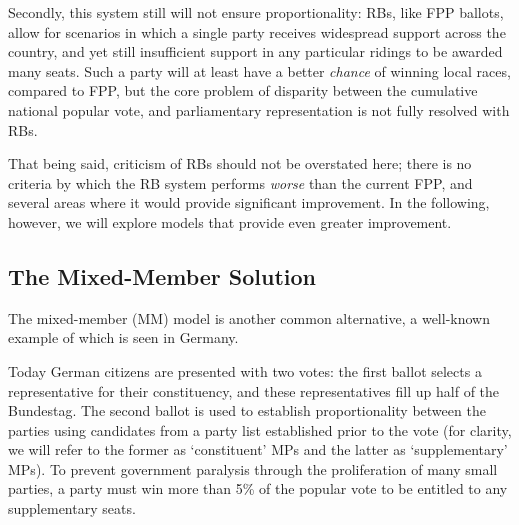 Secondly, this system still will not ensure proportionality: RBs, like FPP ballots, allow for scenarios in which a single party receives widespread support across the country, and yet still insufficient support in any particular ridings to be awarded many seats. 
Such a party will at least have a better \emph{chance} of winning local races, compared to FPP, but the core problem of disparity between the cumulative national popular vote, and parliamentary representation is not fully resolved with RBs.

That being said, criticism of RBs should not be overstated here; there is no criteria by which the RB system performs \emph{worse} than the current FPP, and several areas where it would provide significant improvement.
In the following, however, we will explore models that provide even greater improvement.


\subsection{The Mixed-Member Solution}
\label{sec:german_model}

The mixed-member (MM) model is another common alternative, a well-known example of which is seen in Germany.

Today German citizens are presented with two votes: the first ballot selects a representative for their constituency, and these representatives fill up half of the Bundestag.
The second ballot is used to establish proportionality between the parties using candidates from a party list established prior to the vote
(for clarity, we will refer to the former as `constituent' MPs  and the latter as `supplementary' MPs).
To prevent government paralysis through the proliferation of many small parties, a party must win more than 5\% of the popular vote to be entitled to any supplementary seats.

